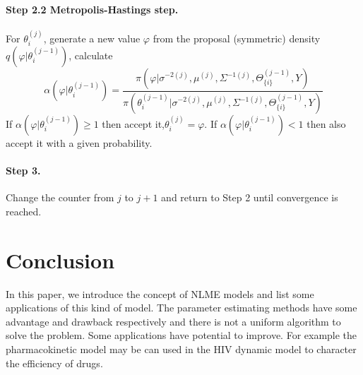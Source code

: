 \documentclass[12pt]{extarticle}
\begin{document}
\paragraph{Step 2.2 Metropolis-Hastings step.}
For $\theta{}_{i}^{(j)}$, generate a new value $\varphi$ from the proposal (symmetric) density $q(\varphi{}|\theta{}_{i}^{(j-1)})$, calculate
\begin{equation}
\alpha{}(\varphi{}|\theta{}_{i}^{(j-1)})=\frac{\pi{}(\varphi{}|\sigma{}^{-2(j)},\mu{}^{(j)},\Sigma{}^{-1(j)},\Theta{}_{\{i\}}^{(j-1)},Y)}{\pi{}(\theta{}_{i}^{(j-1)}|\sigma{}^{-2(j)},\mu{}^{(j)},\Sigma{}^{-1(j)},\Theta{}_{\{i\}}^{(j-1)},Y)}
\end{equation}
If $\alpha{}(\varphi{}|\theta{}_{i}^{(j-1)})\ge{}1$ then accept it,$\theta{}_{i}^{(j)}=\varphi{}$. If $\alpha{}(\varphi{}|\theta{}_{i}^{(j-1)})<1$ then also accept it with a given probability.
\paragraph{Step 3.}
Change the counter from $j$ to $j+1$ and return to Step 2 until convergence is reached.

\section{Conclusion}
In this paper, we introduce the concept of NLME models and list some applications of this kind of model. The parameter estimating methods have some advantage and drawback respectively and there is not a uniform algorithm to solve the problem. Some applications have potential to improve. For example the pharmacokinetic model may be can used in the HIV dynamic model to character the efficiency of drugs.
\end{document}
